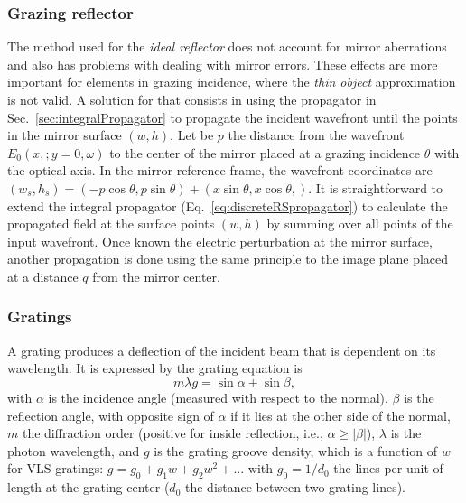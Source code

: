 \documentclass[preprint]{iucr}              %
\begin{document}
\subsubsection{Grazing reflector}
\label{sec:grazingReflector}

The method used for the {\it ideal reflector} does not account for mirror aberrations and also has problems with dealing with mirror errors. These effects are more important for elements in grazing incidence, where the {\it thin object} approximation is not valid. A solution for that consists in using the propagator in Sec.~\ref{sec:integralPropagator} to propagate the incident wavefront until the points in the mirror surface $(w,h)$. Let be $p$ the distance from the wavefront $E_0(x,;y=0,\omega)$ to the center of the mirror placed at a grazing incidence $\theta$ with the optical axis. In the mirror reference frame, the wavefront coordinates are $(w_s, h_s) =(-p \cos \theta, p \sin \theta) + (x \sin \theta, x \cos \theta,)$. It is straightforward to extend the integral propagator (Eq.~\ref{eq:discreteRSpropagator}) to calculate the propagated field at the surface points $(w,h)$ by summing over all points of the input wavefront. Once known the electric perturbation at the mirror surface, another propagation is done using the same principle to the image plane placed at a distance $q$ from the  mirror center. 

\subsubsection{Gratings}
\label{sec:grating}

A grating produces a deflection of the incident beam that is dependent on its wavelength. It is expressed by the grating equation is
\begin{equation}
    m \lambda g = \sin\alpha + \sin\beta,
\end{equation}
with $\alpha$ is the incidence angle (measured with respect to the normal), $\beta$ is the reflection angle, with opposite sign of $\alpha$ if it lies at the other side of the normal, $m$ the diffraction order (positive for inside reflection, i.e., $\alpha \ge |\beta|$),
$\lambda$ is the photon wavelength, and $g$ is the grating groove density, which is a function of $w$ for VLS gratings: $g = g_0 + g_1 w + g_2 w^2 + ...$ with $g_0 = 1/d_0$ the lines per unit of length at the grating center ($d_0$ the distance between two grating lines).
\end{document}
